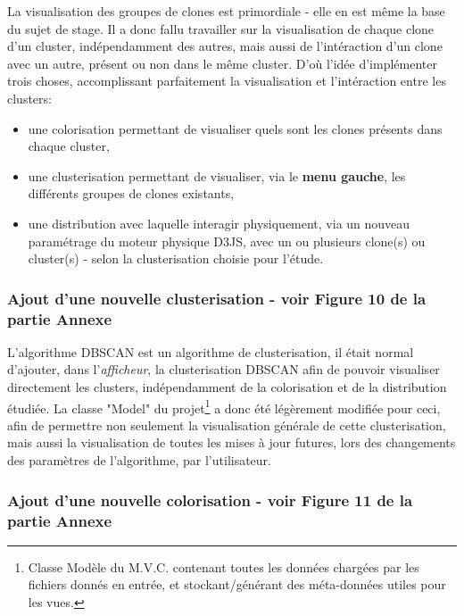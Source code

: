 \documentclass[12pt]{report}
\begin{document}
\begin{spacing}{1.2}
La visualisation des groupes de clones est primordiale - elle en est même la base du sujet de stage.
\newline
Il a donc fallu travailler sur la visualisation de chaque clone d'un cluster, indépendamment des autres, mais aussi de l'intéraction d'un clone avec un autre, présent ou non dans le même cluster.
\newline
D'où l'idée d'implémenter trois choses, accomplissant parfaitement la visualisation et l'intéraction entre les clusters:
	\begin{itemize}
	\item{une colorisation permettant de visualiser quels sont les clones présents dans chaque cluster,}
	\item{une clusterisation permettant de visualiser, via le \textbf{menu gauche}, les différents groupes de clones existants,}
	\item{une distribution avec laquelle interagir physiquement, via un nouveau paramétrage du moteur physique D3JS, avec un ou plusieurs clone(s) ou cluster(s) - selon la clusterisation choisie pour l'étude.}
	\end{itemize}

\subsubsection{Ajout d'une nouvelle clusterisation - voir \textbf{Figure 10} de la partie \textbf{Annexe}}

L'algorithme DBSCAN est un algorithme de clusterisation, il était normal d'ajouter, dans l'\textit{afficheur}, la clusterisation DBSCAN afin de pouvoir visualiser directement les clusters, indépendamment de la colorisation et de la distribution étudiée.
\newline
La classe "Model" du projet\footnote{Classe Modèle du M.V.C. contenant toutes les données chargées par les fichiers donnés en entrée, et stockant/générant des méta-données utiles pour les vues.} a donc été légèrement modifiée pour ceci, afin de permettre non seulement la visualisation générale de cette clusterisation, mais aussi la visualisation de toutes les mises à jour futures, lors des changements des paramètres de l'algorithme, par l'utilisateur.

\subsubsection{Ajout d'une nouvelle colorisation - voir \textbf{Figure 11} de la partie \textbf{Annexe}}


\end{spacing}
\end{document}
